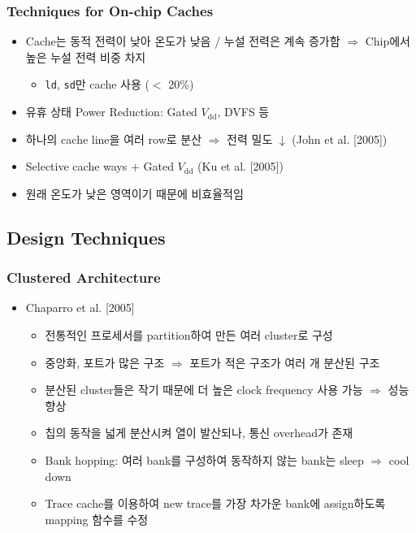\subsubsection*{Techniques for On-chip Caches}
\begin{itemize}
    \item Cache는 동적 전력이 낮아 온도가 낮음 / 누설 전력은 계속 증가함 $\Rightarrow$ Chip에서 높은 누설 전력 비중 차지
    \begin{itemize}
        \item \texttt{ld}, \texttt{sd}만 cache 사용 ($<$ 20\%)
    \end{itemize}
    \item 유휴 상태 Power Reduction: Gated $V_{\mathrm{dd}}$, DVFS 등
    \item 하나의 cache line을 여러 row로 분산 $\Rightarrow$ 전력 밀도 $\downarrow$ (John et al. [2005])
    \item Selective cache ways + Gated $V_{\mathrm{dd}}$ (Ku et al. [2005])
    \item 원래 온도가 낮은 영역이기 때문에 비효율적임
\end{itemize}

\subsection{Design Techniques}

\subsubsection*{Clustered Architecture}
\begin{itemize}
    \item Chaparro et al. [2005]
    \begin{itemize}
        \item 전통적인 프로세서를 partition하여 만든 여러 cluster로 구성
        \item 중앙화, 포트가 많은 구조 $\Rightarrow$ 포트가 적은 구조가 여러 개 분산된 구조
        \item 분산된 cluster들은 작기 때문에 더 높은 clock frequency 사용 가능 $\Rightarrow$ 성능 향상
        \item 칩의 동작을 넓게 분산시켜 열이 발산되나, 통신 overhead가 존재
        \item Bank hopping: 여러 bank를 구성하여 동작하지 않는 bank는 sleep $\Rightarrow$ cool down
        \item Trace cache를 이용하여 new trace를 가장 차가운 bank에 assign하도록 mapping 함수를 수정
    \end{itemize}
\end{itemize}

